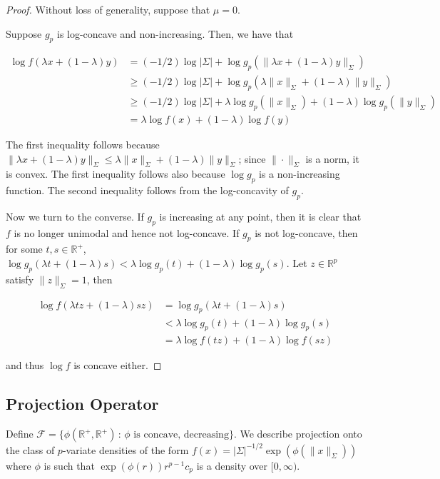 \documentclass[12pt]{article}
\begin{document}
\begin{proof}

Without loss of generality, suppose that $\mu = 0$. 

Suppose $g_p$ is log-concave and non-increasing. Then, we have that

\begin{align*}
\log f ( \lambda x + (1 - \lambda) y) &= (-1/2) \log |\Sigma| 
   + \log g_p( \| \lambda x + (1- \lambda) y \|_{\Sigma} ) \\
   &\geq  (-1/2) \log |\Sigma| 
   + \log g_p( \lambda \| x \|_{\Sigma} + (1 - \lambda) \| y \|_{\Sigma} )\\
   &\geq  (-1/2) \log |\Sigma| 
   + \lambda \log g_p( \|x\|_{\Sigma}) + (1 - \lambda) \log g_p( \| y \|_{\Sigma}) \\
   &= \lambda \log f (x) + (1-\lambda) \log f(y)
\end{align*}

The first inequality follows because $\| \lambda x  + (1-\lambda) y \|_{\Sigma} \leq \lambda \|x\|_{\Sigma} + (1- \lambda) \|y\|_{\Sigma}$; since $\| \cdot \|_{\Sigma}$ is a norm, it is convex. The first inequality follows also because $\log g_p$ is a non-increasing function. The second inequality follows from the log-concavity of $g_p$.

Now we turn to the converse. If $g_p$ is increasing at any point, then it is clear that $f$ is no longer unimodal and hence not log-concave. If $g_p$ is not log-concave, then for some $t, s \in \mathbb{R}^+$, $\log g_p( \lambda t + (1-\lambda) s) < \lambda \log g_p(t) + (1-\lambda) \log g_p(s)$. Let $z \in \mathbb{R}^p$ satisfy $\|z \|_{\Sigma} = 1$, then 

\begin{align*}
\log f ( \lambda tz + (1-\lambda) sz) &= \log g_p(\lambda t + (1-\lambda) s)  \\
   &< \lambda \log g_p( t) + (1-\lambda) \log g_p(s) \\
   &= \lambda \log f( tz ) + (1 - \lambda) \log f( sz )
\end{align*}

and thus $\log f$ is concave either. 

\end{proof}

\subsection{Projection Operator}

Define $\mathcal{F} = \{ \phi(\mathbb{R}^+, \mathbb{R}^+) \,:\, \phi \text{ is concave, decreasing} \}$. We describe projection onto the class of $p$-variate densities of the form $f(x) = | \Sigma |^{-1/2} \exp( \phi( \| x \|_{\Sigma} ))$ where $\phi$ is such that $\exp( \phi(r)) r^{p-1} c_p$ is a density over $[0, \infty)$. \\
\end{document}
